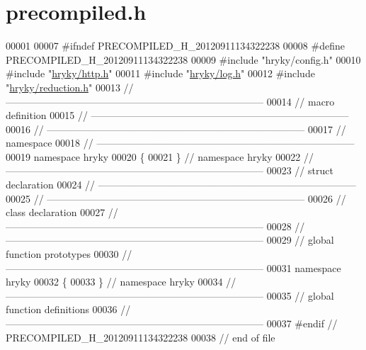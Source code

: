 \hypertarget{http_2src_2precompiled_8h_source}{\section{precompiled.\-h}
}

\begin{DoxyCode}
00001 
00007 \textcolor{preprocessor}{#ifndef PRECOMPILED\_H\_20120911134322238}
00008 \textcolor{preprocessor}{}\textcolor{preprocessor}{#define PRECOMPILED\_H\_20120911134322238}
00009 \textcolor{preprocessor}{}\textcolor{preprocessor}{#include "hryky/config.h"}
00010 \textcolor{preprocessor}{#include "\hyperlink{http_8h}{hryky/http.h}"}
00011 \textcolor{preprocessor}{#include "\hyperlink{log_8h}{hryky/log.h}"}
00012 \textcolor{preprocessor}{#include "\hyperlink{reduction_8h}{hryky/reduction.h}"}
00013 \textcolor{comment}{//
      ------------------------------------------------------------------------------}
00014 \textcolor{comment}{// macro definition}
00015 \textcolor{comment}{//
      ------------------------------------------------------------------------------}
00016 \textcolor{comment}{//
      ------------------------------------------------------------------------------}
00017 \textcolor{comment}{// namespace}
00018 \textcolor{comment}{//
      ------------------------------------------------------------------------------}
00019 \textcolor{keyword}{namespace }hryky
00020 \{
00021 \} \textcolor{comment}{// namespace hryky}
00022 \textcolor{comment}{//
      ------------------------------------------------------------------------------}
00023 \textcolor{comment}{// struct declaration}
00024 \textcolor{comment}{//
      ------------------------------------------------------------------------------}
00025 \textcolor{comment}{//
      ------------------------------------------------------------------------------}
00026 \textcolor{comment}{// class declaration}
00027 \textcolor{comment}{//
      ------------------------------------------------------------------------------}
00028 \textcolor{comment}{//
      ------------------------------------------------------------------------------}
00029 \textcolor{comment}{// global function prototypes}
00030 \textcolor{comment}{//
      ------------------------------------------------------------------------------}
00031 \textcolor{keyword}{namespace }hryky
00032 \{
00033 \} \textcolor{comment}{// namespace hryky}
00034 \textcolor{comment}{//
      ------------------------------------------------------------------------------}
00035 \textcolor{comment}{// global function definitions}
00036 \textcolor{comment}{//
      ------------------------------------------------------------------------------}
00037 \textcolor{preprocessor}{#endif // PRECOMPILED\_H\_20120911134322238}
00038 \textcolor{preprocessor}{}\textcolor{comment}{// end of file}
\end{DoxyCode}
